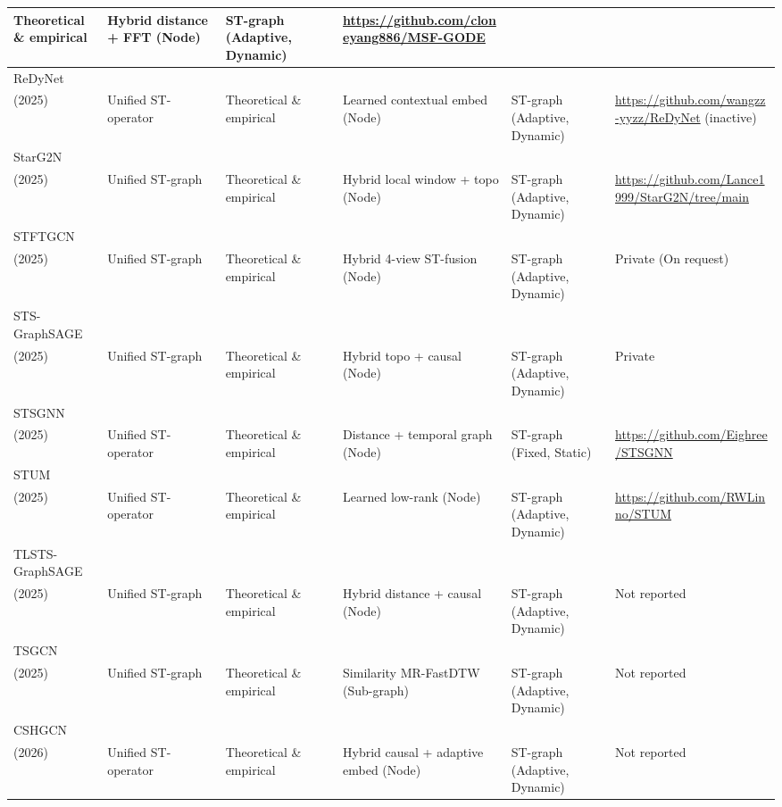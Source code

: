 \begin{longtable}{p{1.5cm} p{1.5cm} p{1.5cm} p{2cm} p{1.5cm} p{2.5cm}}
Theoretical \& empirical &
Hybrid distance + FFT (Node) &
ST-graph (Adaptive, Dynamic) &
\url{https://github.com/cloneyang886/MSF-GODE}
\\
\hline
ReDyNet\\(2025) ~\cite{gao2025responsive}&
Unified ST-operator &
Theoretical \& empirical &
Learned contextual embed (Node) &
ST-graph (Adaptive, Dynamic) &
\url{https://github.com/wangzz-yyzz/ReDyNet} (inactive)
\\
\hline
StarG2N\\(2025) ~\cite{zhao2025starg2n}&
Unified ST-graph &
Theoretical \& empirical &
Hybrid local window + topo (Node) &
ST-graph (Adaptive, Dynamic) &
\url{https://github.com/Lance1999/StarG2N/tree/main}
\\
\hline
STFTGCN\\(2025) ~\cite{zhang2025trend}&
Unified ST-graph &
Theoretical \& empirical &
Hybrid 4-view ST-fusion (Node) &
ST-graph (Adaptive, Dynamic) &
Private (On request)
\\
\hline
STS-GraphSAGE\\(2025) ~\cite{yu2025spatial}&
Unified ST-graph &
Theoretical \& empirical &
Hybrid topo + causal (Node) &
ST-graph (Adaptive, Dynamic) &
Private 
\\
\hline
STSGNN\\(2025) ~\cite{chen2025designing}&
Unified ST-operator &
Theoretical \& empirical &
Distance + temporal graph (Node) &
ST-graph (Fixed, Static) &
\url{https://github.com/Eighree/STSGNN}
\\
\hline
STUM\\(2025) ~\cite{ruan_cross_2025}&
Unified ST-operator &
Theoretical \& empirical &
Learned low-rank (Node) &
ST-graph (Adaptive, Dynamic) &
\url{https://github.com/RWLinno/STUM}
\\
\hline
TLSTS-GraphSAGE\\(2025) ~\cite{yu2025transfer}&
Unified ST-graph &
Theoretical \& empirical &
Hybrid distance + causal (Node) &
ST-graph (Adaptive, Dynamic) &
Not reported
\\
\hline
TSGCN\\(2025) ~\cite{jia2025trajectory}&
Unified ST-graph &
Theoretical \& empirical &
Similarity MR-FastDTW (Sub-graph) &
ST-graph (Adaptive, Dynamic) &
Not reported
\\
\hline
CSHGCN\\(2026) ~\cite{hu2026causal}&
Unified ST-operator &
Theoretical \& empirical &
Hybrid causal + adaptive embed (Node) &
ST-graph (Adaptive, Dynamic) &
Not reported
\\

\end{longtable}
